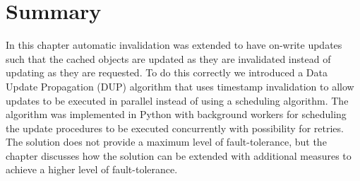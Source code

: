 
\section{Summary}
\label{sec:summary}

In this chapter automatic invalidation was extended to have on-write updates such that the cached objects are updated as they are invalidated instead of updating as they are requested. To do this correctly we introduced a Data Update Propagation (DUP) algorithm that uses timestamp invalidation to allow updates to be executed in parallel instead of using a scheduling algorithm. The algorithm was implemented in Python with background workers for scheduling the update procedures to be executed concurrently with possibility for retries. The solution does not provide a maximum level of fault-tolerance, but the chapter discusses how the solution can be extended with additional measures to achieve a higher level of fault-tolerance.


